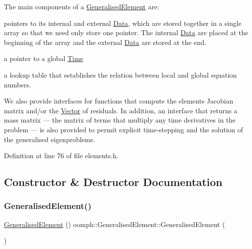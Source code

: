 The main components of a \hyperlink{classoomph_1_1GeneralisedElement}{Generalised\+Element} are\+:
\begin{DoxyItemize}
\item pointers to its internal and external \hyperlink{classoomph_1_1Data}{Data}, which are stored together in a single array so that we need only store one pointer. The internal \hyperlink{classoomph_1_1Data}{Data} are placed at the beginning of the array and the external \hyperlink{classoomph_1_1Data}{Data} are stored at the end.
\item a pointer to a global \hyperlink{classoomph_1_1Time}{Time}
\item a lookup table that establishes the relation between local and global equation numbers.
\end{DoxyItemize}

We also provide interfaces for functions that compute the element\textquotesingle{}s Jacobian matrix and/or the \hyperlink{classoomph_1_1Vector}{Vector} of residuals. In addition, an interface that returns a mass matrix --- the matrix of terms that multiply any time derivatives in the problem --- is also provided to permit explicit time-\/stepping and the solution of the generalised eigenproblems. 

Definition at line 76 of file elements.\+h.



\subsection{Constructor \& Destructor Documentation}
\mbox{\label{classoomph_1_1GeneralisedElement_a245bc1dfb2667394ecd7597a00d1f46f}} 
\subsubsection{\texorpdfstring{Generalised\+Element()}{GeneralisedElement()}}
{\footnotesize\ttfamily \hyperlink{classoomph_1_1GeneralisedElement}{Generalised\+Element} () oomph\+::\+Generalised\+Element\+::\+Generalised\+Element (\begin{DoxyParamCaption}\item[{const \hyperlink{classoomph_1_1GeneralisedElement}{Generalised\+Element} \&}]{ }\end{DoxyParamCaption})\hspace{0.3cm}{\ttfamily [inline]}}



